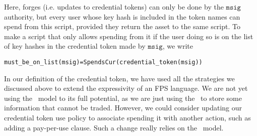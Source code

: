 Here, forges (i.e. updates to credential tokens) can only be done by the
$\texttt{msig}$ authority,
but every user whose key hash is included in the token names can spend from
this script, provided they return the asset to the same script.
To make a script that only allows spending from it if the user doing so
is on the list of key hashes in the credential token made by $\texttt{msig}$, we write

\begin{alltt}
  must_be_on_list(msig) = SpendsCur(credential_token(msig))
\end{alltt}

In our definition of the credential token, we have used all the strategies
we discussed above to extend the expressivity of an FPS language.
We are not yet using the \UTXO\ model to its full potential, as we are just
using the \UTXO\ to store some information that cannot be traded. However, we
could consider updating
our credential token use policy to associate spending it with another action,
such as adding a pay-per-use clause. Such a change really relies on the
\UTXO\ model.
